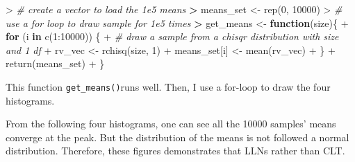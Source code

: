 \documentclass[
]{article}
\newenvironment{Shaded}{\begin{snugshade}}{\end{snugshade}}
\newcommand{\CommentTok}[1]{\textcolor[rgb]{0.56,0.35,0.01}{\textit{#1}}}
\newcommand{\ControlFlowTok}[1]{\textcolor[rgb]{0.13,0.29,0.53}{\textbf{#1}}}
\newcommand{\DecValTok}[1]{\textcolor[rgb]{0.00,0.00,0.81}{#1}}
\newcommand{\ErrorTok}[1]{\textcolor[rgb]{0.64,0.00,0.00}{\textbf{#1}}}
\newcommand{\FunctionTok}[1]{\textcolor[rgb]{0.00,0.00,0.00}{#1}}
\newcommand{\NormalTok}[1]{#1}
\newcommand{\OtherTok}[1]{\textcolor[rgb]{0.56,0.35,0.01}{#1}}
\newcommand{\SpecialCharTok}[1]{\textcolor[rgb]{0.00,0.00,0.00}{#1}}
\begin{document}
\begin{Shaded}
\begin{Highlighting}[]
\SpecialCharTok{\textgreater{}} \CommentTok{\# create a vector to load the 1e5 means}
\ErrorTok{\textgreater{}}\NormalTok{ means\_set }\OtherTok{\textless{}{-}} \FunctionTok{rep}\NormalTok{(}\DecValTok{0}\NormalTok{, }\DecValTok{10000}\NormalTok{)}
\SpecialCharTok{\textgreater{}} \CommentTok{\# use a for loop to draw sample for 1e5 times}
\ErrorTok{\textgreater{}}\NormalTok{ get\_means }\OtherTok{\textless{}{-}} \ControlFlowTok{function}\NormalTok{(size)\{ }
\SpecialCharTok{+}   \ControlFlowTok{for}\NormalTok{ (i }\ControlFlowTok{in} \FunctionTok{c}\NormalTok{(}\DecValTok{1}\SpecialCharTok{:}\DecValTok{10000}\NormalTok{)) \{}
\SpecialCharTok{+}     \CommentTok{\# draw a sample from a chisqr distribution with size and 1 df}
\SpecialCharTok{+}\NormalTok{     rv\_vec }\OtherTok{\textless{}{-}} \FunctionTok{rchisq}\NormalTok{(size, }\DecValTok{1}\NormalTok{)}
\SpecialCharTok{+}\NormalTok{     means\_set[i] }\OtherTok{\textless{}{-}} \FunctionTok{mean}\NormalTok{(rv\_vec)}
\SpecialCharTok{+}\NormalTok{   \}}
\SpecialCharTok{+}   \FunctionTok{return}\NormalTok{(means\_set)}
\SpecialCharTok{+}\NormalTok{ \} }
\end{Highlighting}
\end{Shaded}

This function \texttt{get\_means()}runs well. Then, I use a for-loop to
draw the four histograms.

From the following four histograms, one can see all the 10000 samples'
means converge at the peak. But the distribution of the means is not
followed a normal distribution. Therefore, these figures demonstrates
that LLNs rather than CLT.
\end{document}
